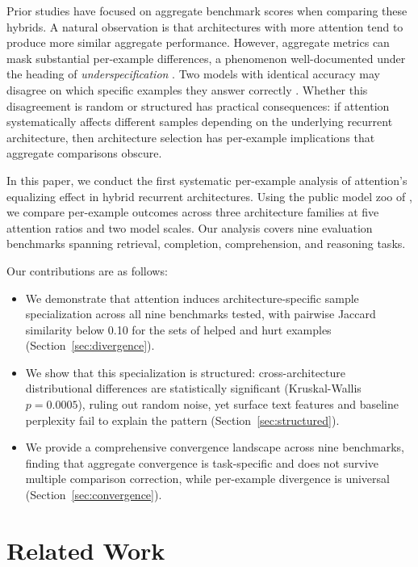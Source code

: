 \documentclass[11pt,a4paper]{article}
\begin{document}
Prior studies have focused on aggregate benchmark scores when comparing these hybrids. A natural observation is that architectures with more attention tend to produce more similar aggregate performance. However, aggregate metrics can mask substantial per-example differences, a phenomenon well-documented under the heading of \emph{underspecification} \citep{damour2022underspecification}. Two models with identical accuracy may disagree on which specific examples they answer correctly \citep{mccoy2020berts, sellam2022multiberts}. Whether this disagreement is random or structured has practical consequences: if attention systematically affects different samples depending on the underlying recurrent architecture, then architecture selection has per-example implications that aggregate comparisons obscure.

In this paper, we conduct the first systematic per-example analysis of attention's equalizing effect in hybrid recurrent architectures. Using the public model zoo of \citet{wang2025mamba}, we compare per-example outcomes across three architecture families at five attention ratios and two model scales. Our analysis covers nine evaluation benchmarks spanning retrieval, completion, comprehension, and reasoning tasks.

Our contributions are as follows:
\begin{itemize}
\item We demonstrate that attention induces architecture-specific sample specialization across all nine benchmarks tested, with pairwise Jaccard similarity below 0.10 for the sets of helped and hurt examples (Section~\ref{sec:divergence}).
\item We show that this specialization is structured: cross-architecture distributional differences are statistically significant (Kruskal-Wallis $p = 0.0005$), ruling out random noise, yet surface text features and baseline perplexity fail to explain the pattern (Section~\ref{sec:structured}).
\item We provide a comprehensive convergence landscape across nine benchmarks, finding that aggregate convergence is task-specific and does not survive multiple comparison correction, while per-example divergence is universal (Section~\ref{sec:convergence}).
\end{itemize}

\section{Related Work}
\end{document}

